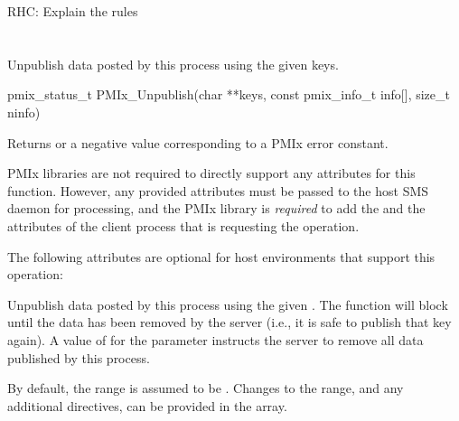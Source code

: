 RHC: Explain the rules


\section{}

\summary

Unpublish data posted by this process using the given keys.

\format

\cspecificstart
\begin{codepar}
pmix_status_t
PMIx_Unpublish(char **keys,
               const pmix_info_t info[], size_t ninfo)
\end{codepar}
\cspecificend

\begin{arglist}
\end{arglist}

Returns  or a negative value corresponding to a PMIx error constant.

\reqattrstart
\ac{PMIx} libraries are not required to directly support any attributes for this function. However, any provided attributes must be passed to the host \ac{SMS} daemon for processing, and the \ac{PMIx} library is \textit{required} to add the  and the  attributes of the client process that is requesting the operation.

\reqattrend

\optattrstart
The following attributes are optional for host environments that support this operation:


\optattrend

\descr

Unpublish data posted by this process using the given .
The function will block until the data has been removed by the server (i.e., it is safe to publish that key again).
A value of  for the  parameter instructs the server to remove all data published by this process.

By default, the range is assumed to be .
Changes to the range, and any additional directives, can be provided in the  array.



